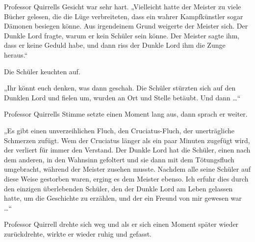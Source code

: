 Professor Quirrells Gesicht war sehr hart.
„Vielleicht hatte der Meister zu viele Bücher gelesen, die die Lüge verbreiteten, dass ein wahrer Kampfkünstler sogar Dämonen besiegen könne. Aus irgendeinem Grund weigerte der Meister sich. Der Dunkle Lord fragte, warum er kein Schüler sein könne. Der Meister sagte ihm, dass er keine Geduld habe, und dann riss der Dunkle Lord ihm die Zunge heraus.“

Die Schüler keuchten auf.

„Ihr könnt euch denken, was dann geschah. Die Schüler stürzten sich auf den Dunklen Lord und fielen um, wurden an Ort und Stelle betäubt. Und dann …“

Professor Quirrells Stimme setzte einen Moment lang aus, dann sprach er weiter.

„Es gibt einen unverzeihlichen Fluch, den Cruciatus-Fluch, der unerträgliche Schmerzen zufügt. Wem der Cruciatus länger als ein paar Minuten zugefügt wird, der verliert für immer den Verstand. Der Dunkle Lord hat die Schüler, einen nach dem anderen, in den Wahnsinn gefoltert und sie dann mit dem Tötungsfluch umgebracht, während der Meister zusehen musste. Nachdem alle seine Schüler auf diese Weise gestorben waren, erging es dem Meister ebenso. Ich erfuhr dies durch den einzigen überlebenden Schüler, den der Dunkle Lord am Leben gelassen hatte, um die Geschichte zu erzählen, und der ein Freund von mir gewesen war …“

Professor Quirrell drehte sich weg und als er sich einen Moment später wieder zurückdrehte, wirkte er wieder ruhig und gefasst.

